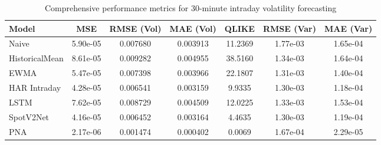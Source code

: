 \documentclass[journal]{IEEEtran}
\begin{document}
\begin{table*}[!t]
\centering
\caption{Comprehensive performance metrics for 30-minute intraday volatility forecasting}
\label{tab:comprehensive_results}
\begin{tabular}{@{}lS[table-format=1.2e-1]S[table-format=1.6]S[table-format=1.6]S[table-format=1.4]S[table-format=1.2e-1]S[table-format=1.2e-1]@{}}
\toprule
{Model} & {MSE} & {RMSE (Vol)} & {MAE (Vol)} & {QLIKE} & {RMSE (Var)} & {MAE (Var)} \\
\midrule
{}Naive & 5.90e-05 & 0.007680 & 0.003913 & 11.2369 & 1.77e-03 & 1.65e-04 \\
HistoricalMean & 8.61e-05 & 0.009282 & 0.004955 & 38.5160 & 1.34e-03 & 1.64e-04 \\
EWMA & 5.47e-05 & 0.007398 & 0.003966 & 22.1807 & 1.31e-03 & 1.40e-04 \\
HAR Intraday & 4.28e-05 & 0.006541 & 0.003159 & 9.9335 & 1.30e-03 & 1.18e-04 \\
LSTM & 7.62e-05 & 0.008729 & 0.004509 & 12.0225 & 1.33e-03 & 1.53e-04 \\
SpotV2Net & 4.16e-05 & 0.006452 & 0.003164 & 4.4635 & 1.30e-03 & 1.19e-04 \\
PNA & 2.17e-06 & 0.001474 & 0.000402 & 0.0069 & 1.67e-04 & 2.29e-05 \\
\bottomrule
\end{tabular}
\end{table*}
\end{document}
